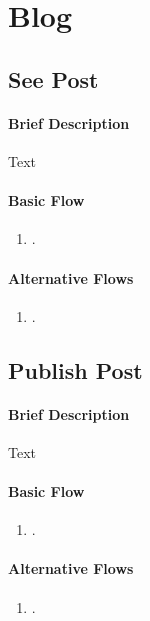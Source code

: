 \documentclass{report}
\begin{document}
\vspace{1em}
\section{Blog}
\subsection{See Post}
\paragraph{Brief Description}
Text

\begin{multicols}{2}
    \paragraph{Basic Flow}
    \begin{enumerate}
        \item .
    \end{enumerate}
    \columnbreak

    \paragraph{Alternative Flows}
    \begin{enumerate}[label=A\arabic*.]
        \item .
    \end{enumerate}
\end{multicols}

\vspace{1em}
\subsection{Publish Post}
\paragraph{Brief Description}
Text

\begin{multicols}{2}
    \paragraph{Basic Flow}
    \begin{enumerate}
        \item .
    \end{enumerate}
    \columnbreak

    \paragraph{Alternative Flows}
    \begin{enumerate}[label=A\arabic*.]
        \item .
    \end{enumerate}
\end{multicols}
\end{document}
